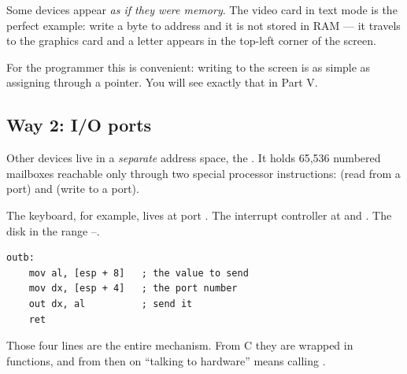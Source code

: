 Some devices appear \emph{as if they were memory}. The video card in text mode is the perfect
example: write a byte to address  and it is not stored in RAM --- it travels to the
graphics card and a letter appears in the top-left corner of the screen.

\begin{center}
\end{center}

For the programmer this is convenient: writing to the screen is as simple as assigning through a
pointer. You will see exactly that in Part V.

\subsection{Way 2: I/O ports}

Other devices live in a \emph{separate} address space, the . It holds 65,536
numbered mailboxes reachable only through two special processor instructions:  (read from
a port) and  (write to a port).

The keyboard, for example, lives at port . The interrupt controller at  and
. The disk in the range --.

\begin{lstlisting}[style=asm]
outb:
    mov al, [esp + 8]   ; the value to send
    mov dx, [esp + 4]   ; the port number
    out dx, al          ; send it
    ret
\end{lstlisting}

Those four lines are the entire mechanism. From C they are wrapped in functions, and from then on
``talking to hardware'' means calling .

